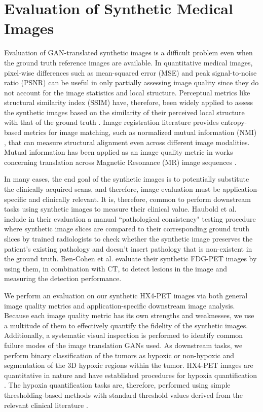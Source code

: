 \section{Evaluation of Synthetic Medical Images}

Evaluation of GAN-translated synthetic images is a difficult problem even when the ground truth reference images are available. In quantitative medical images, pixel-wise differences such as mean-squared error (MSE) and peak signal-to-noise ratio (PSNR) can be useful in only partially assessing image quality since they do not account for the image statistics and local structure. Perceptual metrics like structural similarity index (SSIM) have, therefore, been widely applied to assess the synthetic images based on the similarity of their perceived local structure with that of the ground truth \cite{yi2019generative}. Image registration literature provides entropy-based metrics for image matching, such as normalized mutual information (NMI) \cite{studholme1999overlap}, that can measure structural alignment even across different image modalities. Mutual information has been applied as an image quality metric in works concerning translation across Magnetic Resonance (MR) image sequences \cite{yang2018mri, welander2018generative}. 

In many cases, the end goal of the synthetic images is to potentially substitute the clinically acquired scans, and therefore, image evaluation must be application-specific and clinically relevant. It is, therefore, common to perform downstream tasks using synthetic images to measure their clinical value. Haubold et al. \cite{haubold2021contrast} include in their evaluation a manual ``pathological consistency" testing procedure where synthetic image slices are compared to their corresponding ground truth slices by trained radiologists to check whether the synthetic image preserves the patient's existing pathology and doesn't insert pathology that is non-existent in the ground truth. Ben-Cohen et al. \cite{bencohen2018crossmodality} evaluate their synthetic FDG-PET images by using them, in combination with CT, to detect lesions in the image and measuring the detection performance.  

We perform an evaluation on our synthetic HX4-PET images via both general image quality metrics and application-specific downstream image analysis. Because each image quality metric has its own strengths and weaknesses, we use a multitude of them to effectively quantify the fidelity of the synthetic images. Additionally, a systematic visual inspection is performed to identify common failure modes of the image translation GANs used. As downstream tasks, we perform binary classification of the tumors as hypoxic or non-hypoxic and segmentation of the 3D hypoxic regions within the tumor. HX4-PET images are quantitative in nature and have established procedures for hypoxia quantification \cite{zegers2013hypoxia}. The hypoxia quantification tasks are, therefore, performed using simple thresholding-based methods with standard threshold values derived from the relevant clinical literature \cite{zegers2013hypoxia, even2017predicting}.